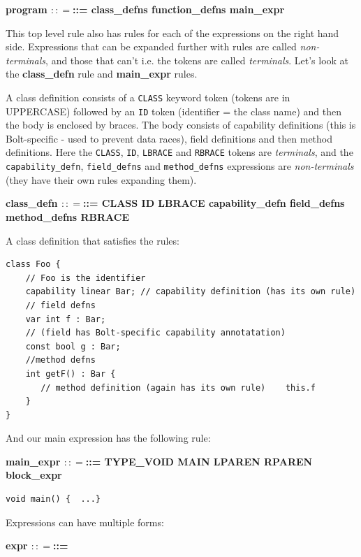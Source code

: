 \textbf{program {{{\(:: =\)}{{{}{::=}}}}} class\_defns function\_defns
main\_expr}

This top level rule also has rules for each of the expressions on the
right hand side. Expressions that can be expanded further with rules are
called \emph{non-terminals}, and those that can't i.e. the tokens are
called \emph{terminals}. Let's look at the \textbf{class\_defn} rule and
\textbf{main\_expr} rules.

A class definition consists of a \texttt{CLASS} keyword token (tokens
are in UPPERCASE) followed by an \texttt{ID} token (identifier = the
class name) and then the body is enclosed by braces. The body consists
of capability definitions (this is Bolt-specific - used to prevent data
races), field definitions and then method definitions. Here the
\texttt{CLASS}, \texttt{ID}, \texttt{LBRACE} and \texttt{RBRACE} tokens
are \emph{terminals}, and the \texttt{capability\_defn},
\texttt{field\_defns} and \texttt{method\_defns} expressions are
\emph{non-terminals} (they have their own rules expanding them).

\textbf{class\_defn {{{\(:: =\)}{{{}{::=}}}}} CLASS ID LBRACE
capability\_defn field\_defns method\_defns RBRACE}

A class definition that satisfies the rules:




\begin{lstlisting}[caption={{class\_example.bolt}}]
class Foo { 
    // Foo is the identifier  
    capability linear Bar; // capability definition (has its own rule)  
    // field defns  
    var int f : Bar; 
    // (field has Bolt-specific capability annotatation)  
    const bool g : Bar;  
    //method defns  
    int getF() : Bar {  
       // method definition (again has its own rule)    this.f  
    }
}
\end{lstlisting}

And our main expression has the following rule:

\textbf{main\_expr {{{\(:: =\)}{{{}{::=}}}}} TYPE\_VOID MAIN LPAREN
RPAREN block\_expr}

%

\begin{verbatim}
void main() {  ...}
\end{verbatim}

Expressions can have multiple forms:

\textbf{expr {{{\(:: =\)}{{{}{::=}}}}}}

